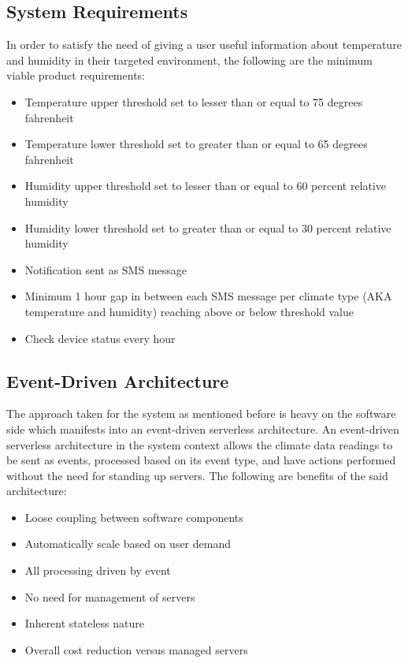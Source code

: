 \documentclass{article}
\begin{document}
\subsection{System Requirements}
In order to satisfy the need of giving a user useful information about temperature and humidity in their targeted environment, the following are the minimum viable product requirements:

\begin{itemize}
    \setlength{\itemindent}{2em}
	\item Temperature upper threshold set to lesser than or equal to 75 degrees fahrenheit
	\item Temperature lower threshold set to greater than or equal to 65 degrees fahrenheit
	\item Humidity upper threshold set to lesser than or equal to 60 percent relative humidity
	\item Humidity lower threshold set to greater than or equal to 30 percent relative humidity
	\item Notification sent as SMS message
	\item Minimum 1 hour gap in between each SMS message per climate type (AKA temperature and humidity) reaching above or below threshold value
	\item Check device status every hour
\end{itemize}

\subsection{Event-Driven Architecture}
The approach taken for the system as mentioned before is heavy on the software side which manifests into an event-driven serverless architecture. An event-driven serverless architecture in the system context allows the climate data readings to be sent as events, processed based on its event type, and have actions performed without the need for standing up servers. The following are benefits of the said architecture:

\begin{itemize}
	\setlength{\itemindent}{2em}
	\item Loose coupling between software components
	\item Automatically scale based on user demand
	\item All processing driven by event
	\item No need for management of servers
	\item Inherent stateless nature
	\item Overall cost reduction versus managed servers
\end{itemize}
\end{document}
